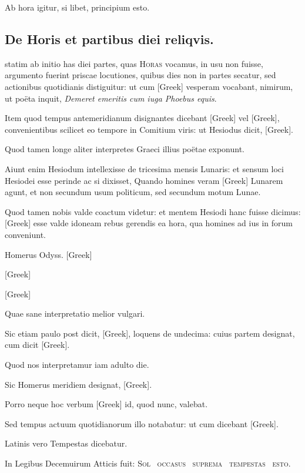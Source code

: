 Ab hora igitur, si libet, principium esto.


\subsection[De Horis et partibus diei reliquis.]{De Horis et partibus diei reliqvis.}

 statim ab initio has diei partes, quas \textsc{Horas}
vocamus, in usu non fuisse, argumento fuerint priscae locutiones,
quibus dies non in partes secatur, sed actionibus quotidianis
distiguitur: ut cum \textgreek{[Greek]} vesperam vocabant, nimirum, ut poëta
inquit, \textit{Demeret emeritis cum iuga Phoebus equis}.

Item quod tempus
antemeridianum disignantes dicebant \textgreek{[Greek]} vel \textgreek{[Greek]},
convenientibus scilicet eo tempore in Comitium viris: ut Hesiodus dicit,
\textgreek{[Greek]}.

Quod tamen longe aliter interpretes
Graeci illius poëtae exponunt.

Aiunt enim Hesiodum intellexisse
de tricesima mensis Lunaris: et sensum loci Hesiodei esse perinde
ac si dixisset, Quando homines veram \textgreek{[Greek]} Lunarem agunt, et
non secundum usum politicum, sed secundum motum Lunae.

Quod
tamen nobis valde coactum videtur: et mentem Hesiodi hanc fuisse dicimus:
\textgreek{[Greek]} esse valde idoneam rebus gerendis ea hora, qua homines
ad ius in forum conveniunt.

Homerus Odyss. \textgreek{[Greek]}

\textgreek{[Greek]}

\textgreek{[Greek]}

Quae sane interpretatio melior vulgari.

Sic etiam paulo post dicit,
\textgreek{[Greek]}, loquens de undecima: cuius partem designat, cum dicit
\textgreek{[Greek]}.

Quod nos interpretamur iam adulto die.

Sic Homerus
meridiem designat, \textgreek{[Greek]}.

Porro neque
hoc verbum \textgreek{[Greek]} id, quod nunc, valebat.

Sed tempus actuum quotidianorum
illo notabatur: ut cum dicebant \textgreek{[Greek]}.

Latinis
vero Tempestas dicebatur.

In Legibus Decemuirum Atticis fuit:
\textsc{Sol~ occasus~
suprema~ tempestas~ esto}.

